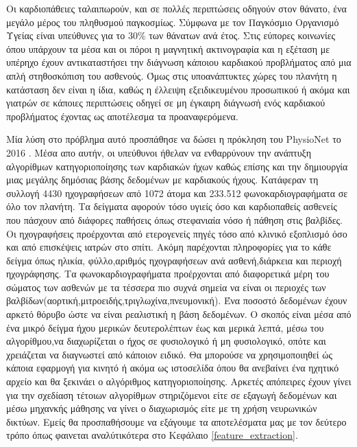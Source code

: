 \documentclass[../main.tex]{subfiles}
\begin{document}
Οι καρδιοπάθειες ταλαιπωρούν, και σε πολλές περιπτώσεις οδηγούν στον θάνατο, ένα
μεγάλο μέρος του πληθυσμού παγκοσμίως. Σύμφωνα με τον Παγκόσμιο Οργανισμό
Υγείας\cite{who} είναι υπεύθυνες για το 30\% των θάνατων ανά έτος. Στις εύπορες
κοινωνίες όπου υπάρχουν τα μέσα και οι πόροι η μαγνητική ακτινογραφία και η
εξέταση με υπέρηχο έχουν αντικαταστήσει την διάγνωση κάποιου καρδιακού
προβλήματος από μια απλή στηθοσκόπιση του ασθενούς. Όμως στις υποανάπτυκτες
χώρες του πλανήτη η κατάσταση δεν είναι η ίδια, καθώς η έλλειψη εξειδικευμένου
προσωπικού ή ακόμα και γιατρών σε κάποιες περιπτώσεις οδηγεί σε μη έγκαιρη
διάγνωσή ενός καρδιακού προβλήματος έχοντας ως αποτέλεσμα τα προαναφερόμενα.

Μία λύση στο πρόβλημα αυτό προσπάθησε να δώσει η πρόκληση του PhysioNet το 2016
\cite{clifford2016classification}. Μέσα απο αυτήν, οι υπεύθυνοι ήθελαν να
ενθαρρύνουν την ανάπτυξη αλγορίθμων κατηγοριοποίησης των καρδιακών ήχων καθώς
επίσης και την δημιουργία μιας μεγάλης δημόσιας βάσης δεδομένων με καρδιακούς
ήχους. Κατάφεραν τη συλλογή 4430 ηχογραφήσεων από 1072 άτομα και 233.512
φωνοκαρδιογραφήματα σε όλο τον πλανήτη.  Τα δείγματα αφορούν τόσο υγιείς όσο και
καρδιοπαθείς ασθενείς που πάσχουν από διάφορες παθήσεις όπως στεφανιαία νόσο ή
πάθηση στις βαλβίδες. Οι ηχογραφήσεις προέρχονται από ετερογενείς πηγές τόσο από
κλινικό εξοπλισμό όσο και από επισκέψεις ιατρών στο σπίτι. Ακόμη παρέχονται
πληροφορίες για το κάθε δείγμα όπως ηλικία, φύλλο,αριθμός ηχογραφήσεων ανά
ασθενή,διάρκεια και περιοχή ηχογράφησης. Τα φωνοκαρδιογραφήματα προέρχονται από
διαφορετικά μέρη του σώματος των ασθενών με τα τέσσερα πιο συχνά σημεία να είναι
οι περιοχές των βαλβίδων(αορτική,μιτροειδής,τριγλωχίνα,πνευμονική). Ένα ποσοστό
δεδομένων έχουν αρκετό θόρυβο ώστε να είναι ρεαλιστική η βάση δεδομένων.  Ο
σκοπός είναι μέσα από ένα μικρό δείγμα ήχου μερικών δευτερολέπτων έως και μερικά
λεπτά, μέσω του αλγορίθμου,να διαχωρίζεται ο ήχος σε φυσιολογικό ή μη
φυσιολογικό, οπότε και χρειάζεται να διαγνωστεί από κάποιον ειδικό. Θα μπορούσε
να χρησιμοποιηθεί ώς κάποια εφαρμογή για κινητό ή ακόμα ως ιστοσελίδα όπου θα
ανεβαίνει ένα ηχητικό αρχείο και θα ξεκινάει ο αλγόριθμος κατηγοριοποίησης.
Αρκετές απόπειρες έχουν γίνει για την σχεδίαση τέτοιων αλγορίθμων στηριζόμενοι
είτε σε εξαγωγή δεδομένων και μέσω μηχανκής μάθησης να γίνει ο διαχωρισμός είτε
με τη χρήση νευρωνικών δικτύων. Εμείς θα προσπαθήσουμε να εξάγουμε τα
αποτελέσματα μας με τον δεύτερο τρόπο όπως φαινεται αναλύτικότερα στο Κεφάλαιο
\ref{feature_extraction}.
\end{document}
